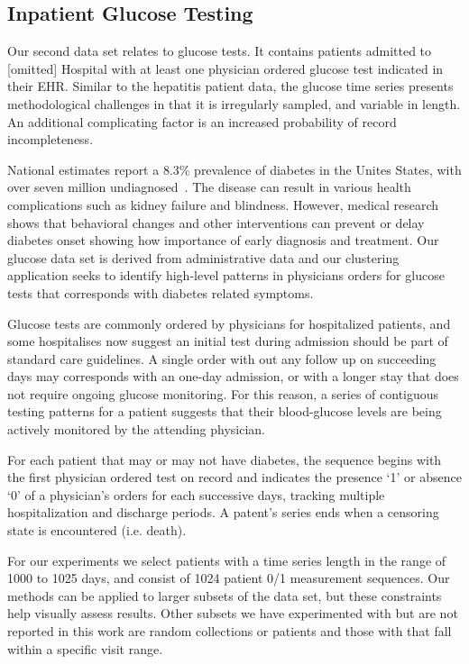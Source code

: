 \subsection{Inpatient Glucose Testing}
Our second data set relates to glucose tests.  It contains patients admitted to [omitted] Hospital with at least one physician ordered glucose test indicated in their EHR. Similar to the hepatitis patient data, the glucose time series presents methodological challenges in that it is irregularly sampled, and variable in length.  An additional complicating factor is an increased probability of record incompleteness.

National estimates report a 8.3\% prevalence of diabetes in the Unites States, with over seven million undiagnosed~\cite{cdc}.  The disease can result in various health complications such as kidney failure and blindness.  However, medical research shows that behavioral changes and other interventions can prevent or delay diabetes onset showing how importance of early diagnosis and treatment. Our glucose data set is derived from administrative data and our clustering application seeks to identify high-level patterns in physicians orders for glucose tests that corresponds with diabetes related symptoms.

Glucose tests are commonly ordered by physicians for hospitalized patients, and some hospitalises now suggest an initial test during admission should be part of standard care guidelines.  A single order with out any follow up on succeeding days may corresponds with an one-day admission, or with a longer stay that does not require ongoing glucose
monitoring. For this reason, a series of contiguous testing patterns for a patient suggests that their blood-glucose levels are being actively monitored by the attending physician.

For each patient that may or may not have diabetes, the sequence begins with the first physician ordered test on record and indicates the presence `1' or absence `0' of a physician's orders for each successive days, tracking multiple hospitalization and discharge periods.  A patent's series ends when a censoring state is encountered (i.e. death).


For our experiments we select patients with a time series length in the range of 1000 to 1025 days, and consist of 1024 patient 0/1 measurement sequences.  Our methods can be applied to larger subsets of the data set, but these constraints help visually assess results.  Other subsets we have experimented with but are not reported in this work are random collections or patients and those with that fall within a specific visit range.
